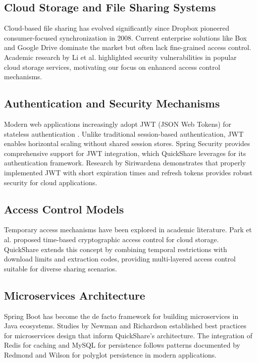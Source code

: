\documentclass[final]{cvpr}
\begin{document}
\subsection{Cloud Storage and File Sharing Systems}
Cloud-based file sharing has evolved significantly since Dropbox pioneered consumer-focused synchronization in 2008. Current enterprise solutions like Box \cite{box2024enterprise} and Google Drive \cite{googledrive2024} dominate the market but often lack fine-grained access control. Academic research by Li et al. \cite{li2014secure} highlighted security vulnerabilities in popular cloud storage services, motivating our focus on enhanced access control mechanisms.

\subsection{Authentication and Security Mechanisms}
Modern web applications increasingly adopt JWT (JSON Web Tokens) for stateless authentication \cite{jones2015json}. Unlike traditional session-based authentication, JWT enables horizontal scaling without shared session stores. Spring Security \cite{spring2024security} provides comprehensive support for JWT integration, which QuickShare leverages for its authentication framework. Research by Siriwardena \cite{siriwardena2020advanced} demonstrates that properly implemented JWT with short expiration times and refresh tokens provides robust security for cloud applications.

\subsection{Access Control Models}
Temporary access mechanisms have been explored in academic literature. Park et al. \cite{park2012timebased} proposed time-based cryptographic access control for cloud storage. QuickShare extends this concept by combining temporal restrictions with download limits and extraction codes, providing multi-layered access control suitable for diverse sharing scenarios.

\subsection{Microservices Architecture}
Spring Boot \cite{springboot2024} has become the de facto framework for building microservices in Java ecosystems. Studies by Newman \cite{newman2015building} and Richardson \cite{richardson2018microservices} established best practices for microservices design that inform QuickShare's architecture. The integration of Redis for caching and MySQL for persistence follows patterns documented by Redmond and Wilson \cite{redmond2012seven} for polyglot persistence in modern applications.
\end{document}
